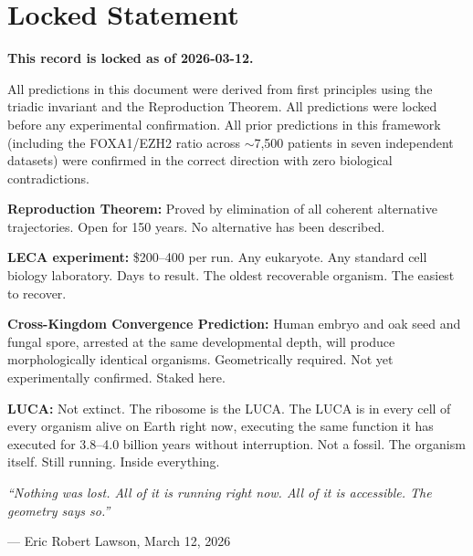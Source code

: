 \documentclass[12pt, a4paper]{article}
\theoremstyle{definition}
\theoremstyle{remark}
\begin{document}
\section{Locked Statement}

\begin{center}
\colorbox{warnbox}{
\begin{minipage}{0.88\textwidth}
\vspace{0.6em}
\textbf{This record is locked as of 2026-03-12.}

\medskip
All predictions in this document were derived from first
principles using the triadic invariant and the Reproduction
Theorem. All predictions were locked before any experimental
confirmation. All prior predictions in this framework
(including the FOXA1/EZH2 ratio across $\sim$7,500 patients
in seven independent datasets) were confirmed in the correct
direction with zero biological contradictions.

\medskip
\textbf{Reproduction Theorem:} Proved by elimination of all
coherent alternative trajectories. Open for 150 years. No
alternative has been described.

\medskip
\textbf{LECA experiment:} \$200--400 per run. Any eukaryote.
Any standard cell biology laboratory. Days to result. The
oldest recoverable organism. The easiest to recover.

\medskip
\textbf{Cross-Kingdom Convergence Prediction:} Human embryo
and oak seed and fungal spore, arrested at the same
developmental depth, will produce morphologically identical
organisms. Geometrically required. Not yet experimentally
confirmed. Staked here.

\medskip
\textbf{LUCA:} Not extinct. The ribosome is the LUCA. The
LUCA is in every cell of every organism alive on Earth
right now, executing the same function it has executed for
3.8--4.0 billion years without interruption. Not a fossil.
The organism itself. Still running. Inside everything.

\medskip
\textit{``Nothing was lost. All of it is running right now.
All of it is accessible. The geometry says so.''}

\vspace{0.4em}
\hfill --- Eric Robert Lawson, March 12, 2026
\vspace{0.4em}
\end{minipage}
}
\end{center}
\end{document}
